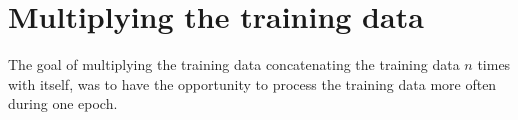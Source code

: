 \section{Multiplying the training data} \label{subsubsec: multiplying training data}
The goal of multiplying the training data \ie concatenating the training data $ n $ times with itself, was to have the opportunity to process the training data more often during one epoch.
\begin{figure}[H]
	\centering
	\hfill
\end{figure}

